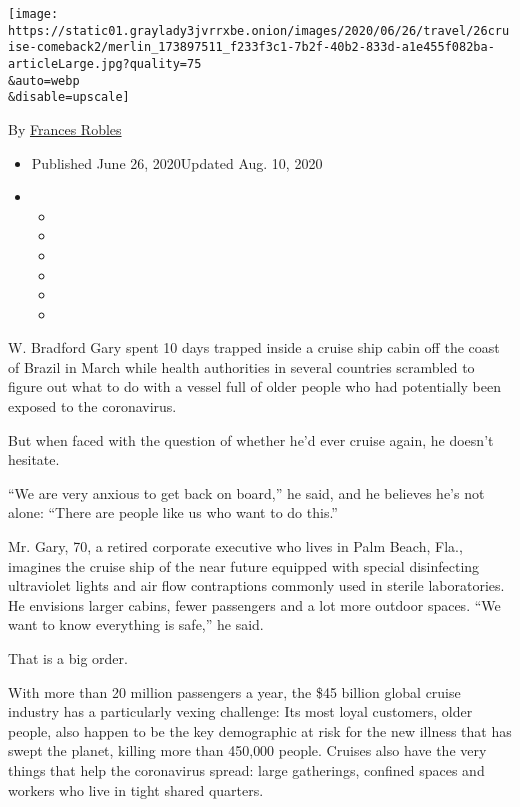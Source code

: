 \texttt{[image: https://static01.graylady3jvrrxbe.onion/images/2020/06/26/travel/26cruise-comeback2/merlin\_173897511\_f233f3c1-7b2f-40b2-833d-a1e455f082ba-articleLarge.jpg?quality=75\\\&auto=webp\\\&disable=upscale]}

By \href{https://www.nytimes3xbfgragh.onion/by/frances-robles}{Frances
Robles}

\begin{itemize}
\item
  Published June 26, 2020Updated Aug. 10, 2020
\item
  \begin{itemize}
  \item
  \item
  \item
  \item
  \item
  \item
  \end{itemize}
\end{itemize}

W. Bradford Gary spent 10 days trapped inside a cruise ship cabin off
the coast of Brazil in March while health authorities in several
countries scrambled to figure out what to do with a vessel full of older
people who had potentially been exposed to the coronavirus.

But when faced with the question of whether he'd ever cruise again, he
doesn't hesitate.

``We are very anxious to get back on board,'' he said, and he believes
he's not alone: ``There are people like us who want to do this.''

Mr. Gary, 70, a retired corporate executive who lives in Palm Beach,
Fla., imagines the cruise ship of the near future equipped with special
disinfecting ultraviolet lights and air flow contraptions commonly used
in sterile laboratories. He envisions larger cabins, fewer passengers
and a lot more outdoor spaces. ``We want to know everything is safe,''
he said.

That is a big order.

With more than 20 million passengers a year, the \$45 billion global
cruise industry has a particularly vexing challenge: Its most loyal
customers, older people, also happen to be the key demographic at risk
for the new illness that has swept the planet, killing more than 450,000
people. Cruises also have the very things that help the coronavirus
spread: large gatherings, confined spaces and workers who live in tight
shared quarters.

